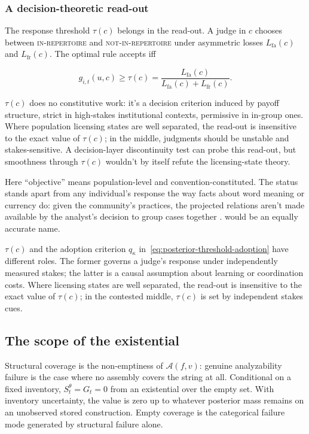 \subsubsection{A decision-theoretic read-out}
\label{sec:decision-readout}

The response threshold $\tau(c)$ belongs in the read-out. A judge in $c$ chooses between
\textsc{in-repertoire} and \textsc{not-in-repertoire} under asymmetric losses
$L_{\mathrm{fa}}(c)$ and $L_{\mathrm{fr}}(c)$. The optimal rule accepts iff

\begin{equation}
g_{i,t}(u,c)\geq \tau(c)
=\frac{L_{\mathrm{fa}}(c)}{L_{\mathrm{fa}}(c)+L_{\mathrm{fr}}(c)}.
\end{equation}

$\tau(c)$ does no constitutive work: it's a decision criterion induced by payoff
structure, strict in high-stakes institutional contexts, permissive in in-group
ones. Where population licensing states are well separated, the read-out is insensitive to the exact
value of $\tau(c)$; in the middle, judgments should be unstable and
stakes-sensitive. A decision-layer discontinuity test can probe this read-out,
but smoothness through $\tau(c)$ wouldn't by itself refute the licensing-state
theory.

Here \enquote{objective} means population-level and convention-constituted. The status
stands apart from any individual's response the way facts about word meaning or
currency do: given the community's practices, the projected relations aren't
made available by the analyst's decision to group cases together
\autocite{reynolds2026kindsProjectibilityProfiles}. 
would be an equally accurate name.

$\tau(c)$ and the adoption criterion
$q_\kappa$ in~\eqref{eq:posterior-threshold-adoption} have different roles. The former governs a
judge's response under independently measured stakes; the latter is a causal
assumption about learning or coordination costs. Where licensing states are
well separated, the read-out is insensitive to the exact value of $\tau(c)$;
in the contested middle, $\tau(c)$ is set by independent stakes cues.

\subsection{The scope of the existential}
\label{sec:existential}
\label{sec:map-clarification}

Structural coverage is the non-emptiness of $\mathcal{A}(f,v)$: genuine
analyzability failure is the case where no assembly covers the string at all.
Conditional on a fixed inventory, $S_t^{\theta}=G_t=0$ from an existential over
the empty set. With inventory uncertainty, the value is zero up to whatever
posterior mass remains on an unobserved stored construction. Empty coverage is
the categorical failure mode generated by structural failure alone.

